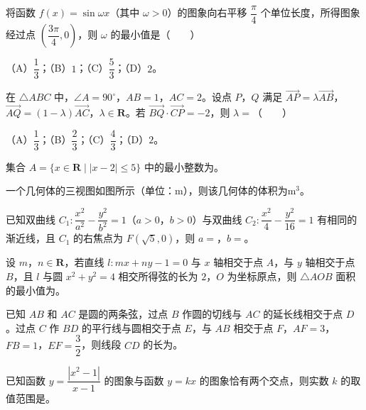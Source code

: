 \begin{question}
将函数 $f(x)=\sin\omega x$（其中 $\omega>0$）的图象向右平移 $\dfrac\pi4$ 个单位长度，所得图象经过点 $\left(\dfrac{3\pi}4,0\right)$，则 $\omega$ 的最小值是\mbox{（　　）}

（A）$\dfrac13$；（B）$1$；（C）$\dfrac53$；（D）$2$。

\end{question}
\begin{question}
在 $\triangle ABC$ 中，$\angle A=90^\circ$，$AB=1$，$AC=2$。设点 $P$，$Q$ 满足 $\overrightarrow{AP}=\lambda\overrightarrow{AB}$，$\overrightarrow{AQ}=(1-\lambda)\overrightarrow{AC}$，$\lambda\in\mathbf R$。若 $\overrightarrow{BQ}\cdot\overrightarrow{CP}=-2$，则 $\lambda=$\mbox{（　　）}

（A）$\dfrac13$；（B）$\dfrac23$；（C）$\dfrac43$；（D）$2$。

\end{question}

\begin{question}
集合 $A=\{x\in\mathbf R\mid |x-2|\leqslant5\}$ 中的最小整数为\gkblank{}。

\Needspace{0.4\textheight}
\end{question}
\begin{question}
一个几何体的三视图如图所示（单位：$\mathrm m$），则该几何体的体积为\gkblank{}$\mathrm{m}^3$。
\nopagebreak[4]
\begin{center}\end{center}
\nopagebreak[4]
\end{question}
\begin{question}
已知双曲线 $C_1:\dfrac{x^2}{a^2}-\dfrac{y^2}{b^2}=1$（$a>0$，$b>0$）与双曲线 $C_2:\dfrac{x^2}4-\dfrac{y^2}{16}=1$ 有相同的渐近线，且 $C_1$ 的右焦点为 $F(\sqrt5,0)$，则 $a=$\gkblank{}，$b=$\gkblank{}。

\end{question}
\begin{question}
设 $m$，$n\in\mathbf R$，若直线 $l:mx+ny-1=0$ 与 $x$ 轴相交于点 $A$，与 $y$ 轴相交于点 $B$，且 $l$ 与圆 $x^2+y^2=4$ 相交所得弦的长为 $2$，$O$ 为坐标原点，则 $\triangle AOB$ 面积的最小值为\gkblank{}。

\Needspace{0.4\textheight}
\end{question}
\begin{question}
已知 $AB$ 和 $AC$ 是圆的两条弦，过点 $B$ 作圆的切线与 $AC$ 的延长线相交于点 $D$。过点 $C$ 作 $BD$ 的平行线与圆相交于点 $E$，与 $AB$ 相交于点 $F$，$AF=3$，$FB=1$，$EF=\dfrac32$，则线段 $CD$ 的长为\gkblank{}。
\nopagebreak[4]
\begin{center}\end{center}
\nopagebreak[4]
\end{question}
\begin{question}
已知函数 $y=\dfrac{|x^2-1|}{x-1}$ 的图象与函数 $y=kx$ 的图象恰有两个交点，则实数 $k$ 的取值范围是\gkblank{}。

\end{question}

